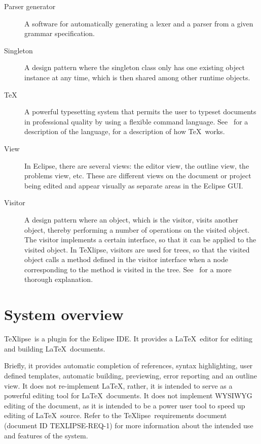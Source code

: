 \documentclass[a4paper,11pt,twoside]{article}
\newcommand{\texlipse}{\TeX lipse}
\begin{document}
\begin{description}
\item[Parser generator] A software for automatically generating a
  lexer and a parser from a given grammar specification.

\item[Singleton] A design pattern where the singleton class only has
  one existing object instance at any time, which is then shared among
  other runtime objects.

\item[\TeX] A powerful typesetting system that permits the user to typeset
  documents in professional quality by using a flexible command
  language. See~\cite{Knuth:texbook84} for a description of the language,
  \cite{Knuth:texprogram86} for a description of how \TeX\ works.

\item[View] In Eclipse, there are several views: the editor view, 
  the outline view, the problems view, etc. These are different views on
  the document or project being edited and appear visually as separate 
  areas in the Eclipse GUI.

\item[Visitor] A design pattern where an object, which is the visitor,
  visits another object, thereby performing a number of operations on
  the visited object. The visitor implements a certain interface, so
  that it can be applied to the visited object. In \texlipse, visitors 
  are used for trees, so that the visited object calls a method 
  defined in the visitor interface when a node corresponding to the 
  method is visited in the tree. See~\cite{Gagnon:mth-98} for a more
  thorough explanation.

\end{description}


\section{System overview}
\label{sect:overview}

\texlipse\ is a plugin for the Eclipse IDE. It provides a \LaTeX\ editor for 
editing and building \LaTeX\ documents.

Briefly, it provides automatic completion of references, syntax highlighting, user 
defined templates, automatic building, previewing, error reporting and an 
outline view. It does not re-implement \LaTeX, rather, it is intended to serve 
as a powerful editing tool for \LaTeX\ documents. It does not implement WYSIWYG 
editing of the document, as it is intended to be a power user tool to speed up 
editing of \LaTeX\ source. Refer to the \texlipse\ requirements document 
(document ID TEXLIPSE-REQ-1) for more information about the intended use and 
features of the system.
\end{document}
